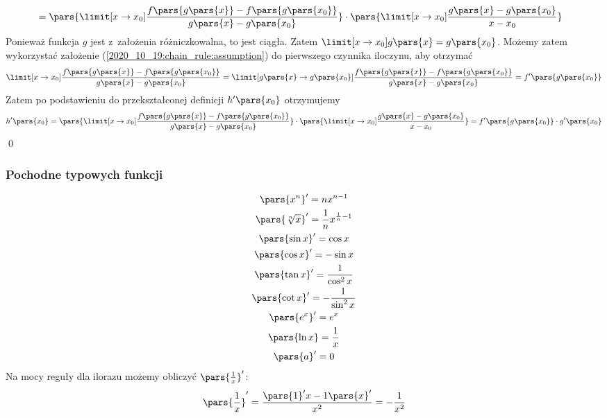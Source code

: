 \begin{itemize}
\begin{gather*}
\begin{split}
                    &= \pars{\limit[x \to x_0] \frac{f\pars{g\pars{x}} - f\pars{g\pars{x_0}}}{g\pars{x} - g\pars{x_0}}} \cdot \pars{\limit[x \to x_0] \frac{g\pars{x} - g\pars{x_0}}{x - x_0}}
            \end{split}
        \end{gather*}
        Ponieważ funkcja \(g\) jest z~założenia różniczkowalna, to jest ciągła. Zatem \(\limit[x \to x_0] g\pars{x} = g\pars{x_0}\). Możemy zatem wykorzystać założenie (\ref{2020_10_19:chain_rule:assumption}) do pierwszego czynnika iloczynu, aby otrzymać
        \begin{equation*}
            \limit[x \to x_0] \frac{f\pars{g\pars{x}} - f\pars{g\pars{x_0}}}{g\pars{x} - g\pars{x_0}}
                = \limit[g\pars{x} \to g\pars{x_0}] \frac{f\pars{g\pars{x}} - f\pars{g\pars{x_0}}}{g\pars{x} - g\pars{x_0}} = f'\pars{g\pars{x_0}}
        \end{equation*}
        Zatem po podstawieniu do przekształconej definicji \(h'\pars{x_0}\) otrzymujemy
        \begin{equation*}
            h'\pars{x_0}
                = \pars{\limit[x \to x_0] \frac{f\pars{g\pars{x}} - f\pars{g\pars{x_0}}}{g\pars{x} - g\pars{x_0}}} \cdot \pars{\limit[x \to x_0] \frac{g\pars{x} - g\pars{x_0}}{x - x_0}}
                = f'\pars{g\pars{x_0}} \cdot g'\pars{x_0}
        \end{equation*}
        \qed
\end{itemize}
\subsubsection*{Pochodne typowych funkcji}
\begin{gather*}
    \pars{x^n}' = nx^{n - 1}\\
    \pars{\sqrt[n]{x}}' = \frac{1}{n}x^{\frac{1}{n} - 1}\\
    \pars{\sin x}' = \cos x\\
    \pars{\cos x}' = -\sin x\\
    \pars{\tan x}' = \frac{1}{\cos^2x}\\
    \pars{\cot x}' = -\frac{1}{\sin^2x}\\
    \pars{e^x}' = e^x\\
    \pars{\ln x} = \frac{1}{x}\\
    \pars{a}' = 0
\end{gather*}
Na mocy reguły dla ilorazu możemy obliczyć \(\pars{\frac{1}{x}}'\):
\begin{equation*}
    \pars{\frac{1}{x}}' = \frac{\pars{1}'x - 1\pars{x}'}{x^2} = -\frac{1}{x^2}
\end{equation*}
